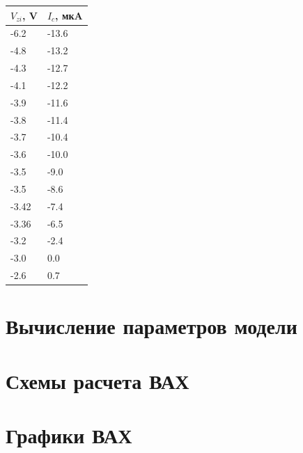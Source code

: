 \documentclass[a4paper,14pt]{article}
\begin{document}
\begin{table}[H]
	\begin{center}
		\begin{tabular}{|l|l|}
			\hline
			$V_{zi}$, V & $I_c$, мкA \\ \hline
			-6.2	&	-13.6\\ \hline
			-4.8	&	-13.2\\ \hline
			-4.3	&	-12.7\\ \hline
			-4.1	&	-12.2\\ \hline
			-3.9	&	-11.6\\ \hline
			-3.8	&	-11.4\\ \hline
			-3.7	&	-10.4\\ \hline
			-3.6	&	-10.0\\ \hline
			-3.5	&	-9.0\\ \hline
			-3.5	&	-8.6\\ \hline
			-3.42	&	-7.4\\ \hline
			-3.36	&	-6.5\\ \hline
			-3.2	&	-2.4\\ \hline
			-3.0	&	0.0\\ \hline
			-2.6	&	0.7\\ \hline
		\end{tabular}
	\end{center}
\end{table}


\section{Вычисление параметров модели}

\section{Схемы расчета ВАХ}

\section{Графики ВАХ}
\end{document}
